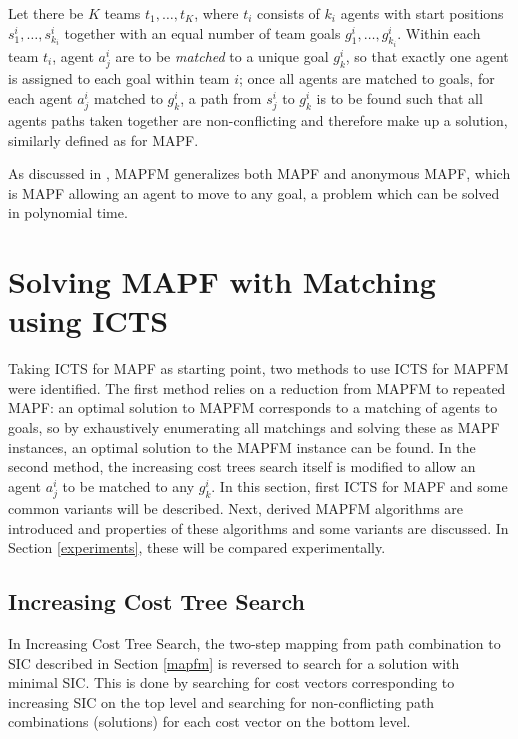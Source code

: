 \documentclass[english,10pt]{article}
\begin{document}
	Let there be $K$ teams $t_1,\ldots, t_K$, where $t_i$ consists of $k_i$ agents with start positions $s_1^i,\ldots,s_{k_i}^i$ together with an equal number of team goals $g_1^i,\ldots,g_{k_i}^i$. Within each team $t_i$, agent $a_j^i$ are to be \textit{matched} to a unique goal $g_k^i$, so that exactly one agent is assigned to each goal within team $i$; once all agents are matched to goals, for each agent $a_j^i$ matched to $g_k^i$, a path from $s_j^i$ to $g_k^i$ is to be found such that all agents paths taken together are non-conflicting and therefore make up a solution, similarly defined as for MAPF.
	
	As discussed in \cite{ma2016}, MAPFM generalizes both MAPF and anonymous MAPF, which is MAPF allowing an agent to move to any goal, a problem which can be solved in polynomial time.
	\section{Solving MAPF with Matching using ICTS} %
	\label{section:icts-matching}
	Taking ICTS for MAPF as starting point, two methods to use ICTS for MAPFM were identified. The first method relies on a reduction from MAPFM to repeated MAPF: an optimal solution to MAPFM corresponds to a matching of agents to goals, so by exhaustively enumerating all matchings and solving these as MAPF instances, an optimal solution to the MAPFM instance can be found. In the second method, the increasing cost trees search itself is modified to allow an agent $a_j^i$ to be matched to any $g_k^i$. In this section, first ICTS for MAPF and some common variants will be described. Next, derived MAPFM algorithms are introduced and properties of these algorithms and some variants are discussed. In Section \ref{experiments}, these will be compared experimentally.
	\subsection{Increasing Cost Tree Search}
	\label{icts}
	In Increasing Cost Tree Search\cite{sharon2011}, the two-step mapping from path combination to SIC described in Section \ref{mapfm} is reversed to search for a solution with minimal SIC. This is done by searching for cost vectors corresponding to increasing SIC on the top level and searching for non-conflicting path combinations (solutions) for each cost vector on the bottom level. 
	
\end{document}
